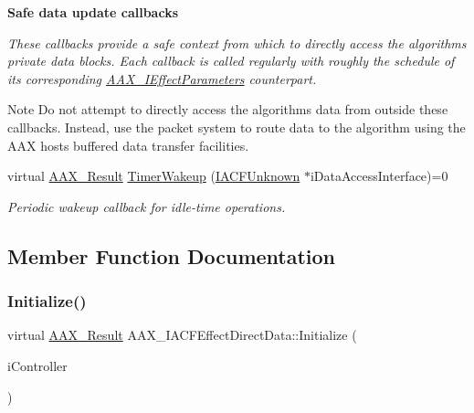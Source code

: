 \begin{Indent}\textbf{ Safe data update callbacks}\par
{\em These callbacks provide a safe context from which to directly access the algorithm\textquotesingle{}s private data blocks. Each callback is called regularly with roughly the schedule of its corresponding \mbox{\hyperlink{a01825}{A\+A\+X\+\_\+\+I\+Effect\+Parameters}} counterpart.

\begin{DoxyNote}{Note}
Do not attempt to directly access the algorithm\textquotesingle{}s data from outside these callbacks. Instead, use the packet system to route data to the algorithm using the A\+AX host\textquotesingle{}s buffered data transfer facilities. 
\end{DoxyNote}
}\begin{DoxyCompactItemize}
\item 
virtual \mbox{\hyperlink{a00392_a4d8f69a697df7f70c3a8e9b8ee130d2f}{A\+A\+X\+\_\+\+Result}} \mbox{\hyperlink{a01661_afb4fa2c566547d7bd303166cf50741bb}{Timer\+Wakeup}} (\mbox{\hyperlink{a01409}{I\+A\+C\+F\+Unknown}} $\ast$i\+Data\+Access\+Interface)=0
\begin{DoxyCompactList}\small\item\em Periodic wakeup callback for idle-\/time operations. \end{DoxyCompactList}\end{DoxyCompactItemize}
\end{Indent}


\subsection{Member Function Documentation}
\mbox{\label{a01661_adefbc617c71ea5ea6512fb79a116dbf7}} 
\subsubsection{\texorpdfstring{Initialize()}{Initialize()}}
{\footnotesize\ttfamily virtual \mbox{\hyperlink{a00392_a4d8f69a697df7f70c3a8e9b8ee130d2f}{A\+A\+X\+\_\+\+Result}} A\+A\+X\+\_\+\+I\+A\+C\+F\+Effect\+Direct\+Data\+::\+Initialize (\begin{DoxyParamCaption}\item[{\mbox{\hyperlink{a01409}{I\+A\+C\+F\+Unknown}} $\ast$}]{i\+Controller }\end{DoxyParamCaption})\hspace{0.3cm}{\ttfamily [pure virtual]}}



